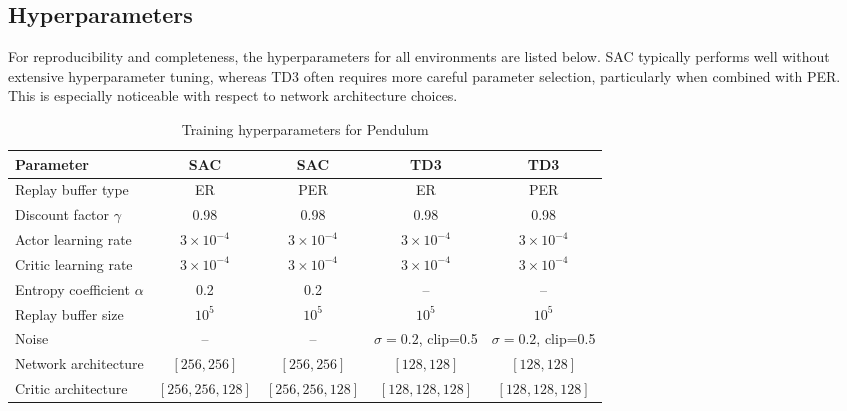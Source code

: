 \documentclass[11pt]{article}
\begin{document}
\subsection{Hyperparameters}
\label{app:simple_parameters}
For reproducibility and completeness, the hyperparameters for all environments are listed below. 
\ac{SAC} typically performs well without extensive hyperparameter tuning, whereas \ac{TD3} often 
requires more careful parameter selection, particularly when combined with \ac{PER}. 
This is especially noticeable with respect to network architecture choices.
\begin{table}[htbp]
\renewcommand{\arraystretch}{0.85}
\centering
\caption{Training hyperparameters for Pendulum}
\vspace{-0.3cm}
\begin{tabular}{lcccc}
\toprule
\textbf{Parameter} 
& \textbf{SAC} 
& \textbf{SAC}
& \textbf{TD3}
& \textbf{TD3} \\
\midrule

Replay buffer type
& ER & PER & ER & PER \\


Discount factor $\gamma$
& 0.98 & 0.98 & 0.98 & 0.98 \\

Actor learning rate
& $3\times10^{-4}$ & $3\times10^{-4}$ 
& $3\times10^{-4}$ & $3\times10^{-4}$ \\

Critic learning rate
& $3\times10^{-4}$ & $3\times10^{-4}$ 
& $3\times10^{-4}$ & $3\times10^{-4}$ \\

Entropy coefficient $\alpha$
& 0.2 & 0.2 & -- & -- \\

Replay buffer size
& $10^5$ & $10^5$ & $10^5$ & $10^5$ \\

Noise
& -- & -- & 
$\sigma=0.2$, \newline clip=0.5 
& $\sigma=0.2$, \newline clip=0.5 \\

Network architecture
& $[256,256]$ & $[256,256]$ 
& $[128,128]$ & $[128,128]$ \\

Critic architecture
& $[256,256,128]$ & $[256,256,128]$ 
& $[128,128,128]$ & $[128,128,128]$ \\

\bottomrule
\end{tabular}
\end{table}
\end{document}
